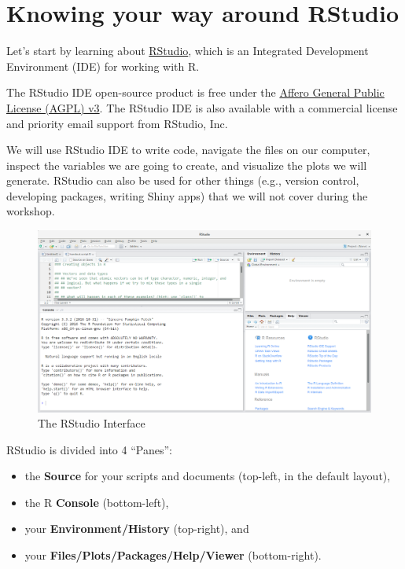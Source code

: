 \documentclass[]{book}
\providecommand{\tightlist}{%
  \setlength{\itemsep}{0pt}\setlength{\parskip}{0pt}}
\theoremstyle{definition}
\theoremstyle{definition}
\theoremstyle{definition}
\theoremstyle{remark}
\begin{document}
\section{Knowing your way around
RStudio}\label{knowing-your-way-around-rstudio}

Let's start by learning about \href{https://www.rstudio.com/}{RStudio},
which is an Integrated Development Environment (IDE) for working with R.

The RStudio IDE open-source product is free under the
\href{https://www.gnu.org/licenses/agpl-3.0.en.html}{Affero General
Public License (AGPL) v3}. The RStudio IDE is also available with a
commercial license and priority email support from RStudio, Inc.

We will use RStudio IDE to write code, navigate the files on our
computer, inspect the variables we are going to create, and visualize
the plots we will generate. RStudio can also be used for other things
(e.g., version control, developing packages, writing Shiny apps) that we
will not cover during the workshop.

\begin{figure}
\includegraphics[width=1\linewidth]{img/rstudio-screenshot} \caption{The RStudio Interface}\label{fig:RStudio-GUI}
\end{figure}

RStudio is divided into 4 ``Panes'':

\begin{itemize}
\tightlist
\item
  the \textbf{Source} for your scripts and documents (top-left, in the
  default layout),
\item
  the R \textbf{Console} (bottom-left),
\item
  your \textbf{Environment/History} (top-right), and
\item
  your \textbf{Files/Plots/Packages/Help/Viewer} (bottom-right).
\end{itemize}
\end{document}
